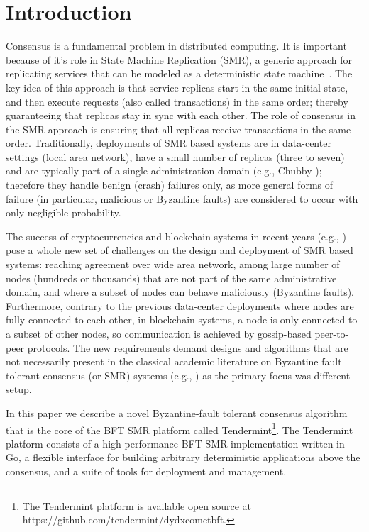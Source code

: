 \section{Introduction} \label{sec:tendermint}

Consensus is a fundamental problem in distributed computing. It
is important because of it's role in State Machine Replication (SMR), a generic
approach for replicating services that can be modeled as a deterministic state
machine~\cite{Lam78:cacm, Sch90:survey}. The key idea of this approach is that
service replicas start in the same initial state, and then execute requests
(also called transactions) in the same order; thereby guaranteeing that
replicas stay in sync with each other. The role of consensus in the SMR
approach is ensuring that all replicas receive transactions in the same order.
Traditionally, deployments of SMR based systems are in data-center settings
(local area network), have a small number of replicas (three to seven) and are
typically part of a single administration domain (e.g., Chubby
\cite{Bur:osdi06}); therefore they handle benign (crash) failures only, as more
general forms of failure (in particular, malicious or Byzantine faults) are
considered to occur with only negligible probability.

The success of cryptocurrencies and blockchain systems in recent years (e.g.,
\cite{Nak2012:bitcoin, But2014:ethereum}) pose a whole new set of challenges on
the design and deployment of SMR based systems: reaching agreement over wide
area network, among large number of nodes (hundreds or thousands) that are not
part of the same administrative domain, and where a subset of nodes can behave
maliciously (Byzantine faults). Furthermore, contrary to the previous
data-center deployments where nodes are fully connected to each other, in
blockchain systems, a node is only connected to a subset of other nodes, so
communication is achieved by gossip-based peer-to-peer protocols.
The new requirements demand designs and algorithms that are not necessarily
present in the classical academic literature on Byzantine fault tolerant
consensus (or SMR) systems (e.g., \cite{DLS88:jacm, CL02:tcs}) as the primary
focus was different setup.

In this paper we describe a novel Byzantine-fault tolerant consensus algorithm
that is the core of the BFT SMR platform called Tendermint\footnote{The
	Tendermint platform is available open source at
	https://github.com/tendermint/dydxcometbft.}. The Tendermint platform consists of
a high-performance BFT SMR implementation written in Go, a flexible interface
for
building arbitrary deterministic applications above the consensus, and a suite
of tools for deployment and management.

